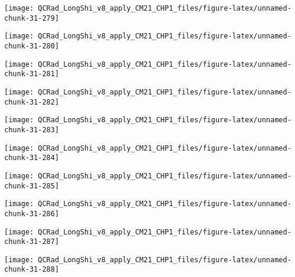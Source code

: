 \documentclass[
  10pt,
  a4paper,oneside]{article}
\begin{document}
\begin{center}\texttt{[image: QCRad\_LongShi\_v8\_apply\_CM21\_CHP1\_files/figure-latex/unnamed-chunk-31-279]} \end{center}

\begin{center}\texttt{[image: QCRad\_LongShi\_v8\_apply\_CM21\_CHP1\_files/figure-latex/unnamed-chunk-31-280]} \end{center}

\begin{center}\texttt{[image: QCRad\_LongShi\_v8\_apply\_CM21\_CHP1\_files/figure-latex/unnamed-chunk-31-281]} \end{center}

\begin{center}\texttt{[image: QCRad\_LongShi\_v8\_apply\_CM21\_CHP1\_files/figure-latex/unnamed-chunk-31-282]} \end{center}

\begin{center}\texttt{[image: QCRad\_LongShi\_v8\_apply\_CM21\_CHP1\_files/figure-latex/unnamed-chunk-31-283]} \end{center}

\begin{center}\texttt{[image: QCRad\_LongShi\_v8\_apply\_CM21\_CHP1\_files/figure-latex/unnamed-chunk-31-284]} \end{center}

\begin{center}\texttt{[image: QCRad\_LongShi\_v8\_apply\_CM21\_CHP1\_files/figure-latex/unnamed-chunk-31-285]} \end{center}

\begin{center}\texttt{[image: QCRad\_LongShi\_v8\_apply\_CM21\_CHP1\_files/figure-latex/unnamed-chunk-31-286]} \end{center}

\begin{center}\texttt{[image: QCRad\_LongShi\_v8\_apply\_CM21\_CHP1\_files/figure-latex/unnamed-chunk-31-287]} \end{center}

\begin{center}\texttt{[image: QCRad\_LongShi\_v8\_apply\_CM21\_CHP1\_files/figure-latex/unnamed-chunk-31-288]} \end{center}
\end{document}
